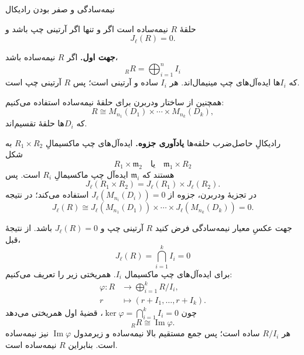 \begin{frame}[t]{نیمه‌سادگی و صفر بودن رادیکال}
\label{lec15:semisimple-criterion}
\begin{theorem}
حلقهٔ \(R\) نیمه‌ساده است اگر و تنها اگر آرتینی چپ باشد و
\[J_\ell(R)=0.\]
\end{theorem}
\textbf{جهت اول.} اگر \(R\) نیمه‌ساده باشد،
\[
 {}_RR=\bigoplus_{i=1}^{n}I_i
\]
که \(I_i\)ها ایده‌آل‌های چپ مینیمال‌اند. هر \(I_i\) ساده و آرتینی است؛ پس \(R\) آرتینی چپ است.
\medskip

همچنین از ساختار ودربرن برای حلقهٔ نیمه‌ساده استفاده می‌کنیم:
\[
 R\cong M_{n_1}(D_1)\times\cdots\times M_{n_k}(D_k),
\]
که \(D_i\)ها حلقهٔ تقسیم‌اند.
\end{frame}

\begin{frame}[t]{رادیکالِ حاصل‌ضرب حلقه‌ها}
\label{lec15:product-radical}
\textbf{یادآوری جزوه.} ایده‌آل‌های چپ ماکسیمالِ \(R_1\times R_2\) به شکل
\[
 R_1\times\mathfrak m_2\quad\text{یا}\quad\mathfrak m_1\times R_2
\]
هستند که \(\mathfrak m_i\) ایده‌آل چپ ماکسیمالِ \(R_i\) است. پس
\[
 J_\ell(R_1\times R_2)=J_\ell(R_1)\times J_\ell(R_2).
\]
در تجزیهٔ ودربرن، جزوه از \(J_\ell(M_{n_i}(D_i))=0\) استفاده می‌کند؛ در نتیجه
\[
 J_\ell(R)\cong
 J_\ell(M_{n_1}(D_1))\times\cdots\times J_\ell(M_{n_k}(D_k))=0.
\]
\end{frame}

\begin{frame}[t]{جهت عکسِ معیار نیمه‌سادگی}
\label{lec15:semisimple-converse}
فرض کنید \(R\) آرتینی چپ و \(J_\ell(R)=0\) باشد. از نتیجهٔ قبل،
\[
 J_\ell(R)=\bigcap_{i=1}^{k}I_i=0
\]
برای ایده‌آل‌های چپ ماکسیمال \(I_i\). همریختی زیر را تعریف می‌کنیم:
\[
 \begin{aligned}
 \varphi:R&\longrightarrow\bigoplus_{i=1}^{k}R/I_i,\\
 r&\longmapsto(r+I_1,\ldots,r+I_k).
 \end{aligned}
\]
چون \(\ker\varphi=\bigcap_{i=1}^kI_i=0\)، قضیهٔ اول همریختی می‌دهد
\[
 {}_RR\cong\operatorname{Im}\varphi.
\]
هر \(R/I_i\) ساده است؛ پس جمع مستقیم بالا نیمه‌ساده و زیرمدول \(\operatorname{Im}\varphi\) نیز نیمه‌ساده است. بنابراین \(R\) نیمه‌ساده است.
\end{frame}

